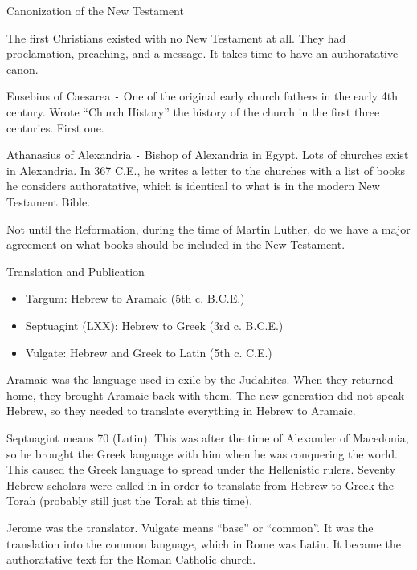 \documentclass{article}
\begin{document}


\centerline{Canonization of the New Testament}

    The first Christians existed with no New Testament at all. They had proclamation, preaching, and a message. It takes time to have an authoratative canon.

    Eusebius of Caesarea \texttt{-} One of the original early church fathers in the early 4th century. Wrote ``Church History'' the history of the church in the first three centuries. First one.

    Athanasius of Alexandria \texttt{-} Bishop of Alexandria in Egypt. Lots of churches exist in Alexandria. In 367 C.E., he writes a letter to the churches with a list of books he considers authoratative, which is identical to what is in the modern New Testament Bible.

    Not until the Reformation, during the time of Martin Luther, do we have a major agreement on what books should be included in the New Testament.

\centerline{Translation and Publication}

    \begin{itemize}
        \item Targum: Hebrew to Aramaic (5th c. B.C.E.)
        \item Septuagint (LXX): Hebrew to Greek (3rd c. B.C.E.)
        \item Vulgate: Hebrew and Greek to Latin (5th c. C.E.)
    \end{itemize}

    Aramaic was the language used in exile by the Judahites. When they returned home, they brought Aramaic back with them. The new generation did not speak Hebrew, so they needed to translate everything in Hebrew to Aramaic.

    Septuagint means 70 (Latin). This was after the time of Alexander of Macedonia, so he brought the Greek language with him when he was conquering the world. This caused the Greek language to spread under the Hellenistic rulers. Seventy Hebrew scholars were called in in order to translate from Hebrew to Greek the Torah (probably still just the Torah at this time).

    Jerome was the translator. Vulgate means ``base'' or ``common''. It was the translation into the common language, which in Rome was Latin. It became the authoratative text for the Roman Catholic church.
\end{document}
